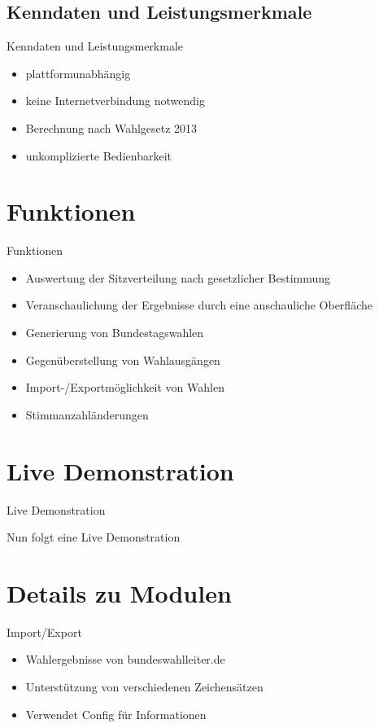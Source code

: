 \documentclass[18pt]{beamer}
\begin{document}
\subsection{Kenndaten und Leistungsmerkmale}
\begin{frame}{Kenndaten und Leistungsmerkmale}
\begin{itemize}
	\item plattformunabhängig
	\item keine Internetverbindung notwendig
	\item Berechnung nach Wahlgesetz 2013
	\item unkomplizierte Bedienbarkeit
\end{itemize}
\end{frame}


\section{Funktionen}
\begin{frame}{Funktionen}
\begin{itemize}
	\item Auswertung der Sitzverteilung nach gesetzlicher Bestimmung
	\item Veranschaulichung der Ergebnisse durch eine anschauliche Oberfläche
	\item Generierung von Bundestagswahlen
	\item Gegenüberstellung von Wahlausgängen
	\item Import-/Exportmöglichkeit von Wahlen
	\item Stimmanzahländerungen
\end{itemize}
\end{frame}

\section{Live Demonstration}
\begin{frame}{Live Demonstration}
\begin{LARGE}
\begin{center}
	Nun folgt eine Live Demonstration
\end{center}
\end{LARGE}
\end{frame}


\section{Details zu Modulen}
\begin{frame}{Import/Export}
\begin{itemize}
	\item Wahlergebnisse von bundeswahlleiter.de
	\item Unterstützung von verschiedenen Zeichensätzen
	\item Verwendet Config für Informationen
\end{itemize}
\end{frame}
\end{document}

